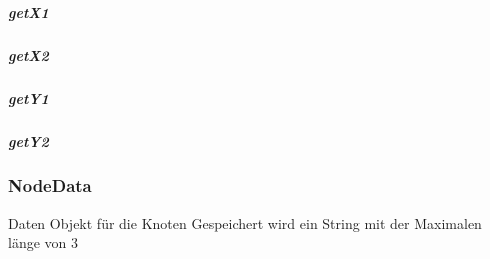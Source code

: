 \documentclass[letterpaper,10pt,ngerman]{sphinxmanual}
\begin{document}
\subparagraph{getX1}
\label{\detokenize{com/linuxluigi/edu/data/DrawnLines:getx1}}

\begin{fulllineitems}
\label{\detokenize{com/linuxluigi/edu/data/DrawnLines:com.linuxluigi.edu.data.DrawnLines.getX1()}}
\end{fulllineitems}



\subparagraph{getX2}
\label{\detokenize{com/linuxluigi/edu/data/DrawnLines:getx2}}

\begin{fulllineitems}
\label{\detokenize{com/linuxluigi/edu/data/DrawnLines:com.linuxluigi.edu.data.DrawnLines.getX2()}}
\end{fulllineitems}



\subparagraph{getY1}
\label{\detokenize{com/linuxluigi/edu/data/DrawnLines:gety1}}

\begin{fulllineitems}
\label{\detokenize{com/linuxluigi/edu/data/DrawnLines:com.linuxluigi.edu.data.DrawnLines.getY1()}}
\end{fulllineitems}



\subparagraph{getY2}
\label{\detokenize{com/linuxluigi/edu/data/DrawnLines:gety2}}

\begin{fulllineitems}
\label{\detokenize{com/linuxluigi/edu/data/DrawnLines:com.linuxluigi.edu.data.DrawnLines.getY2()}}
\end{fulllineitems}



\subsubsection{NodeData}
\label{\detokenize{com/linuxluigi/edu/data/NodeData::doc}}\label{\detokenize{com/linuxluigi/edu/data/NodeData:nodedata}}

\begin{fulllineitems}
\label{\detokenize{com/linuxluigi/edu/data/NodeData:com.linuxluigi.edu.data.NodeData}}
Daten Objekt für die Knoten Gespeichert wird ein String mit der Maximalen länge von 3

\end{fulllineitems}
\end{document}
